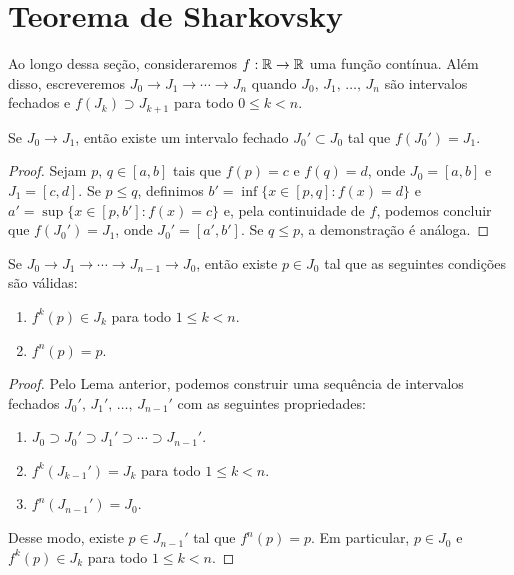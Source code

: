 \section{Teorema de Sharkovsky}

Ao longo dessa seção, consideraremos $f: \mathbb{R} \to \mathbb{R}$ uma função contínua.
Além disso, escreveremos $J_0 \longrightarrow J_1 \longrightarrow \cdots \longrightarrow J_n$ quando $J_0, \, J_1, \, \dots, \, J_n$ são intervalos fechados e $f(J_k) \supset J_{k+1}$ para todo $0 \leq k < n$.

\begin{lemma}
Se $J_0 \longrightarrow J_1$, então existe um intervalo fechado $J_0' \subset J_0$ tal que $f(J_0') = J_1$.
\end{lemma}

\begin{proof}
Sejam $p, \, q \in [a, b]$ tais que $f(p) = c$ e $f(q) = d$, onde $J_0 = [a, b]$ e $J_1 = [c, d]$.
Se $p \leq q$, definimos $b' = \inf \{ x \in [p, q] : f(x) = d \}$ e $a' = \sup \{ x \in [p, b'] : f(x) = c \}$ e, pela continuidade de $f$, podemos concluir que $f(J_0') = J_1$, onde $J_0' = [a', b']$.
Se $q \leq p$, a demonstração é análoga.
\end{proof}

\begin{lemma}
Se $J_0 \longrightarrow J_1 \longrightarrow \cdots \longrightarrow J_{n-1} \longrightarrow J_0$, então existe $p \in J_0$ tal que as seguintes condições são válidas:
\begin{enumerate}
\item $f^k(p) \in J_k$ para todo $1 \leq k < n$.
\item $f^n(p) = p$.
\end{enumerate}
\end{lemma}

\begin{proof}
Pelo Lema anterior, podemos construir uma sequência de intervalos fechados $J_0', \, J_1', \, \dots, \, J_{n-1}'$ com as seguintes propriedades:
\begin{enumerate}[label=\alph*.]
\item $J_0 \supset J_0' \supset J_1' \supset \cdots \supset J_{n-1}'$.
\item $f^k(J_{k-1}') = J_k$ para todo $1 \leq k < n$.
\item $f^n(J_{n-1}') = J_0$.
\end{enumerate}

Desse modo, existe $p \in J_{n-1}'$ tal que $f^n(p) = p$.
Em particular, $p \in J_0$ e $f^k(p) \in J_k$ para todo $1 \leq k < n$.
\end{proof}

